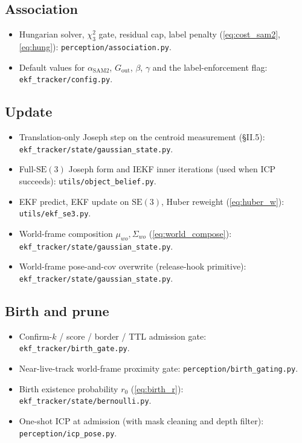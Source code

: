 \documentclass[11pt]{article}
\newcommand{\SE}{\mathrm{SE}(3)}
\newcommand{\file}[1]{\texttt{#1}}
\begin{document}
\subsection*{Association}
\begin{itemize}[leftmargin=1.5em,itemsep=0pt,topsep=2pt]
\item Hungarian solver, $\chi^2_3$ gate, residual cap, label penalty (\eqref{eq:cost_sam2}, \eqref{eq:hung}): \file{perception/association.py}.
\item Default values for $\alpha_{\text{SAM2}}$, $G_{\text{out}}$, $\beta$, $\gamma$ and the label-enforcement flag: \file{ekf\_tracker/config.py}.
\end{itemize}

\subsection*{Update}
\begin{itemize}[leftmargin=1.5em,itemsep=0pt,topsep=2pt]
\item Translation-only Joseph step on the centroid measurement (\S II.5): \file{ekf\_tracker/state/gaussian\_state.py}.
\item Full-$\SE$ Joseph form and IEKF inner iterations (used when ICP succeeds): \file{utils/object\_belief.py}.
\item EKF predict, EKF update on $\SE$, Huber reweight (\eqref{eq:huber_w}): \file{utils/ekf\_se3.py}.
\item World-frame composition $\mu_{wo},\Sigma_{wo}$ (\eqref{eq:world_compose}): \file{ekf\_tracker/state/gaussian\_state.py}.
\item World-frame pose-and-cov overwrite (release-hook primitive): \file{ekf\_tracker/state/gaussian\_state.py}.
\end{itemize}

\subsection*{Birth and prune}
\begin{itemize}[leftmargin=1.5em,itemsep=0pt,topsep=2pt]
\item Confirm-$k$ / score / border / TTL admission gate: \file{ekf\_tracker/birth\_gate.py}.
\item Near-live-track world-frame proximity gate: \file{perception/birth\_gating.py}.
\item Birth existence probability $r_0$ (\eqref{eq:birth_r}): \file{ekf\_tracker/state/bernoulli.py}.
\item One-shot ICP at admission (with mask cleaning and depth filter): \file{perception/icp\_pose.py}.
\end{itemize}
\end{document}

